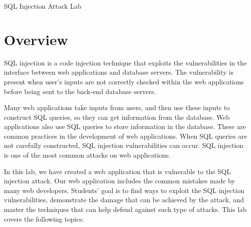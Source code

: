 
\newcommand{\commonfolder}{../../common-files}
\newcommand{\webcommon}{../Web_Common}







\newcommand{\sqlFigs}{./Figs}





\begin{center}
{\LARGE SQL Injection Attack Lab }
\end{center}



\section{Overview}

SQL injection is a code injection technique that exploits the 
vulnerabilities in the interface between web applications and 
database servers. The vulnerability is present when user's inputs 
are not correctly checked within the web applications 
before being sent to the back-end database servers.

Many web applications take inputs from users, and then use these
inputs to construct SQL queries, so they can get information from the database.
Web applications also use SQL queries to store information in
the database. These are common practices in the development of web applications.
When SQL queries are not carefully constructed, 
SQL injection vulnerabilities can occur. 
SQL injection is one of the most common 
attacks on web applications.


In this lab, we have created a web application that is vulnerable to the SQL injection attack. 
Our web application includes the common mistakes made by many web developers. 
Students' goal is to find ways to exploit the SQL injection vulnerabilities,
demonstrate the damage that can be achieved by the attack, 
and master the techniques that can help defend against such type of attacks.
This lab covers the following topics:

